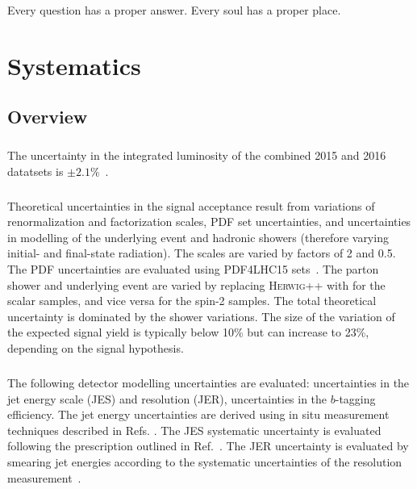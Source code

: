\begin{savequote}[75mm]
Every question has a proper answer. Every soul has a proper place.
\end{savequote}

\chapter{Systematics}
\label{sec:systematics}


\section{Overview}

\paragraph{}
The uncertainty in the integrated luminosity of the combined 2015 and 2016 datatsets is $\pm2.1$\%~\cite{LumiCiteUP}.

\paragraph{}
Theoretical uncertainties in the signal acceptance result from variations of renormalization and factorization scales, PDF set uncertainties, and uncertainties in modelling of the underlying event and hadronic showers (therefore varying initial- and final-state radiation). The scales are varied by factors of 2 and 0.5. The PDF uncertainties are evaluated using \textsc{PDF4LHC15} sets~\cite{pdfs}. 
The parton shower and underlying event are varied by replacing \textsc{Herwig++} with \pythia for the scalar samples, and vice versa for the spin-2 samples. 
The total theoretical uncertainty is dominated by the shower variations. 
The size of the variation of the expected signal yield is typically below 10\% but can increase to 23\%, depending on the signal hypothesis.

\paragraph{}
The following detector modelling uncertainties are evaluated: uncertainties in the jet energy scale (JES) and resolution (JER), uncertainties in the $b$-tagging efficiency. 
The jet energy uncertainties are derived using in situ measurement techniques described in Refs. \cite{ATLAS-CONF-2015-057, ATLAS-CONF-2015-017, ATLAS-CONF-2015-037}. 
The JES systematic uncertainty is evaluated following the prescription outlined in Ref.~\cite{Aad:2014bia}. 
The JER uncertainty is evaluated by smearing jet energies according to the systematic uncertainties of the resolution measurement~\cite{Aad:2014bia}.

